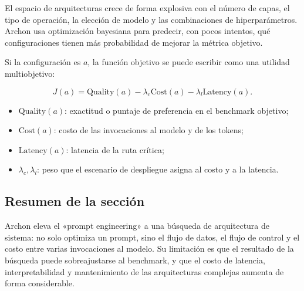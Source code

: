 
El espacio de arquitecturas crece de forma explosiva con el número de capas, el tipo de operación, la elección de modelo y las combinaciones de hiperparámetros. Archon usa optimización bayesiana para predecir, con pocos intentos, qué configuraciones tienen más probabilidad de mejorar la métrica objetivo.


Si la configuración es $a$, la función objetivo se puede escribir como una utilidad multiobjetivo:

$$
J(a)=\mathrm{Quality}(a)-\lambda_c\mathrm{Cost}(a)-\lambda_l\mathrm{Latency}(a).
$$

\begin{itemize}
    \item $\mathrm{Quality}(a)$: exactitud o puntaje de preferencia en el benchmark objetivo;
    \item $\mathrm{Cost}(a)$: costo de las invocaciones al modelo y de los tokens;
    \item $\mathrm{Latency}(a)$: latencia de la ruta crítica;
    \item $\lambda_c,\lambda_l$: peso que el escenario de despliegue asigna al costo y a la latencia.
\end{itemize}


\subsection{Resumen de la sección}

Archon eleva el «prompt engineering» a una búsqueda de arquitectura de sistema: no solo optimiza un prompt, sino el flujo de datos, el flujo de control y el costo entre varias invocaciones al modelo. Su limitación es que el resultado de la búsqueda puede sobreajustarse al benchmark, y que el costo de latencia, interpretabilidad y mantenimiento de las arquitecturas complejas aumenta de forma considerable.

